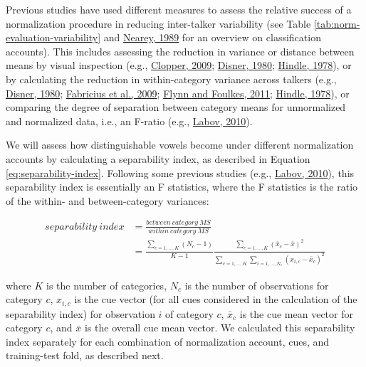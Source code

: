 \documentclass[utf8]{frontiersSCNS}
\begin{document}
Previous studies have used different measures to assess the relative success of a normalization procedure in reducing inter-talker variability (see Table \ref{tab:norm-evaluation-variability} and \protect\hyperlink{ref-nearey1989}{Nearey, 1989} for an overview on classification accounts). This includes assessing the reduction in variance or distance between means by visual inspection (e.g., \protect\hyperlink{ref-clopper2009}{Clopper, 2009}; \protect\hyperlink{ref-disner1980}{Disner, 1980}; \protect\hyperlink{ref-hindle1978}{Hindle, 1978}), or by calculating the reduction in within-category variance across talkers (e.g., \protect\hyperlink{ref-disner1980}{Disner, 1980}; \protect\hyperlink{ref-fabricius2009}{Fabricius et al., 2009}; \protect\hyperlink{ref-Flynn2011}{Flynn and Foulkes, 2011}; \protect\hyperlink{ref-hindle1978}{Hindle, 1978}), or comparing the degree of separation between category means for unnormalized and normalized data, i.e., an F-ratio (e.g., \protect\hyperlink{ref-labov2010}{Labov, 2010}).

We will assess how distinguishable vowels become under different normalization accounts by calculating a separability index, as described in Equation \eqref{eq:separability-index}. Following some previous studies (e.g., \protect\hyperlink{ref-labov2010}{Labov, 2010}), this separability index is essentially an F statistics, where the F statistics is the ratio of the within- and between-category variances:

\begin{equation}\label{eq:separability-index}
\begin{split}
 separability\ index &= \frac{between\ category\ MS}{within\ category\ MS}\\
 &= \frac{\sum\limits_{c=1,\ldots,K}(N_{c}-1)}{K-1}\frac{\sum\limits_{c=1,\ldots,K}(\bar{x}_{c}-\bar{x})^{2}}{\sum\limits_{c=1,\ldots,K} \sum\limits_{i=1,\ldots,N_{c}}(x_{i,c}-\bar{x}_{c})^{2}}
\end{split}
\end{equation}

where \(K\) is the number of categories, \(N_c\) is the number of observations for category \(c\), \(x_{i,c}\) is the cue vector (for all cues considered in the calculation of the separability index) for observation \(i\) of category \(c\), \(\bar{x}_c\) is the cue mean vector for category \(c\), and \(\bar{x}\) is the overall cue mean vector. We calculated this separability index separately for each combination of normalization account, cues, and training-test fold, as described next.
\end{document}
